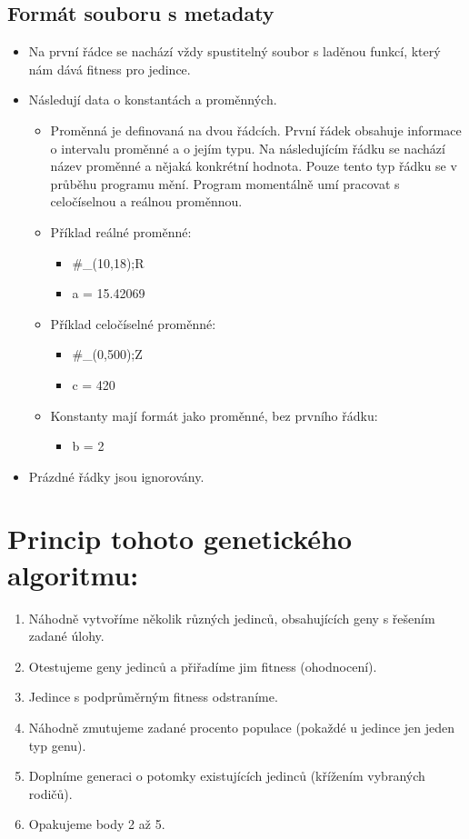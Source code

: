 \documentclass{article}
\begin{document}
\subsection{Formát souboru s metadaty}
\begin{itemize}
\item Na první řádce se nachází vždy spustitelný soubor s laděnou funkcí, který nám dává fitness pro jedince.
\item Následují data o konstantách a proměnných.
\begin{itemize}
\item Proměnná je definovaná na dvou řádcích. První řádek obsahuje informace o intervalu proměnné a o jejím typu. Na následujícím řádku se nachází název proměnné a nějaká konkrétní hodnota. Pouze tento typ řádku se v průběhu programu mění. Program momentálně umí pracovat s celočíselnou a reálnou proměnnou. 
\item Příklad reálné proměnné: \ 
\begin{itemize}
\item \#\_(10,18);R
\item a = 15.42069
\end{itemize}
\item Příklad celočíselné proměnné:
\begin{itemize}
\item \#\_(0,500);Z
\item c = 420
\end{itemize}
\item Konstanty mají formát jako proměnné, bez prvního řádku:
\begin{itemize}
\item b = 2
\end{itemize}
\end{itemize}
\item Prázdné řádky jsou ignorovány.
\end{itemize}


\section{Princip tohoto genetického algoritmu:}
\begin{enumerate}
\item Náhodně vytvoříme několik různých jedinců, obsahujících geny s řešením zadané úlohy.
\item Otestujeme geny jedinců a přiřadíme jim fitness (ohodnocení).
\item Jedince s podprůměrným fitness odstraníme.
\item Náhodně zmutujeme zadané procento populace (pokaždé u jedince jen jeden typ genu).
\item Doplníme generaci o potomky existujících jedinců (křížením vybraných rodičů).
\item Opakujeme body 2 až 5. \ 
\end{enumerate}
\end{document}
